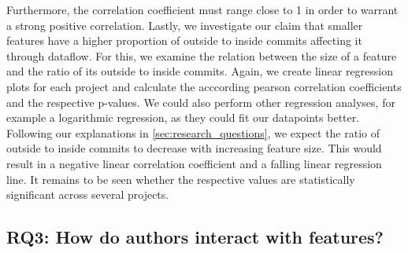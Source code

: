 Furthermore, the correlation coefficient must range close to 1 in order to warrant a strong positive correlation.
Lastly, we investigate our claim that smaller features have a higher proportion of outside to inside commits affecting it through dataflow.
For this, we examine the relation between the size of a feature and the ratio of its outside to inside commits.
Again, we create linear regression plots for each project and calculate the acccording pearson correlation coefficients and the respective p-values.
We could also perform other regression analyses, for example a logarithmic regression, as they could fit our datapoints better.
Following our explanations in \autoref{sec:research_questions}, we expect the ratio of outside to inside commits to decrease with increasing feature size.
This would result in a negative linear correlation coefficient and a falling linear regression line.
It remains to be seen whether the respective values are statistically significant across several projects.

\subsection*{\textbf{RQ3: How do authors interact with features?}}

